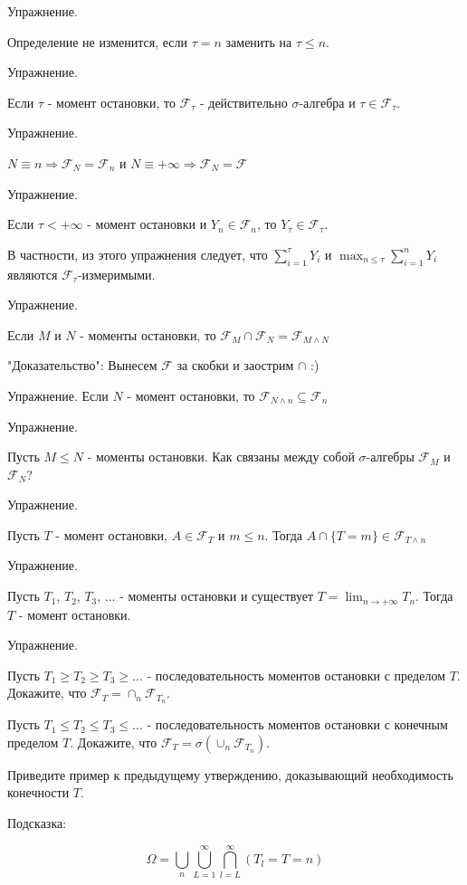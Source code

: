 {Упражнение. \par
Определение не изменится, если $\tau=n$ заменить на $\tau\le n$. \par

Упражнение. \par
Если $\tau$ - момент остановки, то $\mathcal{F}_{\tau}$ - действительно
$\sigma$-алгебра и $\tau\in \mathcal{F}_{\tau}$. \par

Упражнение. \par
$N\equiv n \Rightarrow \mathcal{F}_{N}=\mathcal{F}_{n}$ и $N\equiv +\infty \Rightarrow \mathcal{F}_{N}=\mathcal{F}$ \par

Упражнение. \par
Если $\tau<+\infty$ - момент остановки и $Y_{n}\in\mathcal{F}_{n}$,
то $Y_{\tau}\in\mathcal{F}_{\tau}$. \par
В частности, из этого упражнения следует, что
$\sum_{i=1}^{\tau}Y_{i}$ и $\max_{n\le \tau}\sum_{i=1}^{n}Y_{i}$ являются
$\mathcal{F}_{\tau}$-измеримыми. \par

Упражнение. \par
Если $M$ и $N$ - моменты остановки, то
$\mathcal{F}_{M}\cap\mathcal{F}_{N}=\mathcal{F}_{M\wedge N}$ \par
"Доказательство": Вынесем $\mathcal{F}$ за скобки и заострим $\cap$ :) \par

Упражнение. Если $N$ - момент остановки, то $\mathcal{F}_{N\wedge
n} \subseteq \mathcal{F}_{n}$ \par

Упражнение. \par
Пусть $M\le N$ - моменты остановки.
Как связаны между собой $\sigma$-алгебры $\mathcal{F}_{M}$ и $\mathcal{F}_{N}$? \par

Упражнение. \par
Пусть $T$ - момент остановки, $A\in\mathcal{F}_{T}$ и $m\le n$.
Тогда $A\cap\{T=m\}\in\mathcal{F}_{T\wedge n}$ \par

Упражнение. \par
Пусть $T_{1}$, $T_{2}$, $T_{3}$, ... - моменты остановки и
существует $T=\lim_{n\rightarrow +\infty}T_{n}$. Тогда $T$ - момент
остановки. \par

Упражнение. \par
Пусть $T_{1}\ge T_{2}\ge T_{3}\ge ...$ - последовательность
моментов остановки с пределом $T$. Докажите, что
$\mathcal{F}_{T}=\cap_{n}\mathcal{F}_{T_{n}}$. \par
Пусть $T_{1}\le T_{2}\le T_{3}\le ...$ - последовательность
моментов остановки с конечным пределом $T$. Докажите, что
$\mathcal{F}_{T}=\sigma(\cup_{n}\mathcal{F}_{T_{n}})$. \par
Приведите пример к предыдущему утверждению, доказывающий
необходимость конечности $T$. \par
Подсказка: \par
$$
\Omega=\bigcup_{n}\bigcup_{L=1}^{\infty}\bigcap_{l=L}^{\infty}\left(T_{l}=T=n\right)
$$



}
